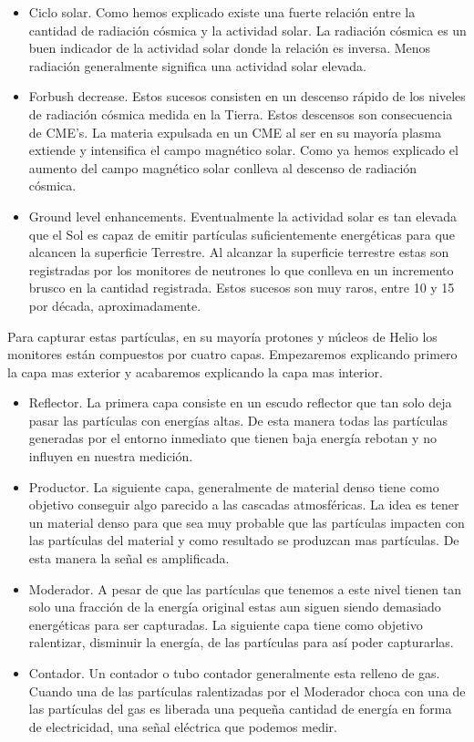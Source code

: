 	\begin{itemize}
	  	\item	Ciclo solar. Como hemos explicado existe una fuerte relación entre la cantidad de radiación cósmica y la actividad solar. 
		  	La radiación cósmica es un buen indicador de la actividad solar donde la relación es inversa. Menos radiación generalmente
			significa una actividad solar elevada.	
		\item	Forbush decrease. Estos sucesos consisten en un descenso rápido de los niveles de radiación cósmica medida en la Tierra. Estos
		  	descensos son consecuencia de CME's. La materia expulsada en un CME al ser en su mayoría plasma extiende y intensifica el 		%
			campo magnético solar. Como ya hemos explicado el aumento del campo magnético solar conlleva al descenso de radiación cósmica. 
		\item	Ground level enhancements. Eventualmente la actividad solar es tan elevada que el Sol es capaz de emitir partículas
		  	suficientemente energéticas para que alcancen la superficie Terrestre. Al alcanzar la superficie terrestre estas son 
			registradas por los monitores de neutrones lo que conlleva en un incremento brusco en la cantidad registrada. Estos sucesos
			son muy raros, entre 10 y 15 por década, aproximadamente.  
	\end{itemize}
	Para capturar estas partículas, en su mayoría protones y núcleos de Helio los monitores están compuestos por cuatro capas. Empezaremos 
	explicando primero la capa mas exterior y acabaremos explicando la capa mas interior.
	\begin{itemize}
		\item   Reflector. La primera capa consiste en un escudo reflector que tan solo deja pasar las partículas con energías altas. De 
		        esta manera todas las partículas generadas por el entorno inmediato que tienen baja energía rebotan y no influyen en nuestra 
			medición. 
		\item   Productor. La siguiente capa, generalmente de material denso tiene como objetivo conseguir algo parecido a las cascadas 
		        atmosféricas. La idea es tener un material denso para que sea muy probable que las partículas impacten con las partículas 
			del material y como resultado se produzcan mas partículas. De esta manera la señal es amplificada. 
		\item   Moderador. A pesar de que las partículas que tenemos a este nivel tienen tan solo una fracción de la energía original estas
		        aun siguen siendo demasiado energéticas para ser capturadas. La siguiente capa tiene como objetivo ralentizar, disminuir 
			la energía, de las partículas para así poder capturarlas.
		\item   Contador. Un contador o tubo contador generalmente esta relleno de gas. Cuando una de las partículas ralentizadas por el 
		        Moderador choca con una de las partículas del gas es liberada una pequeña cantidad de energía en forma de electricidad, 
			una señal eléctrica que podemos medir.
      	\end{itemize}

